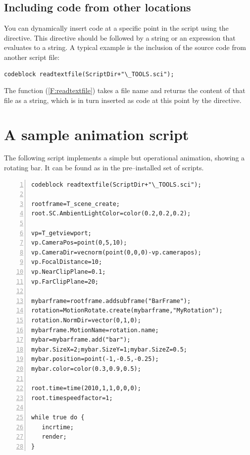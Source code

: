 \subsection{Including code from other locations}
You can dynamically insert code at a specific point in the script using the  directive. This directive should be followed by a string or an expression that evaluates to a string. A typical example is the inclusion of the source code from another script file:


\begin{lstlisting}
codeblock readtextfile(ScriptDir+"\_TOOLS.sci");
\end{lstlisting}

The function  (\ref{F:readtextfile}) takes a file name and returns the content of that file as a string, which is in turn inserted as code at this point by the  directive.

\section{A sample animation script}

The following \scriptlang script implements a simple but operational animation, showing a rotating bar. It can be found as  in the pre--installed set of scripts.

\begin{lstlisting}[numbers=left]
codeblock readtextfile(ScriptDir+"\_TOOLS.sci");

rootframe=T_scene_create;
root.SC.AmbientLightColor=color(0.2,0.2,0.2);

vp=T_getviewport;
vp.CameraPos=point(0,5,10);
vp.CameraDir=vecnorm(point(0,0,0)-vp.camerapos);
vp.FocalDistance=10;
vp.NearClipPlane=0.1;
vp.FarClipPlane=20;

mybarframe=rootframe.addsubframe("BarFrame");
rotation=MotionRotate.create(mybarframe,"MyRotation");
rotation.NormDir=vector(0,1,0);
mybarframe.MotionName=rotation.name;
mybar=mybarframe.add("bar");
mybar.SizeX=2;mybar.SizeY=1;mybar.SizeZ=0.5;
mybar.position=point(-1,-0.5,-0.25);
mybar.color=color(0.3,0.9,0.5);

root.time=time(2010,1,1,0,0,0);
root.timespeedfactor=1;

while true do {
   incrtime;
   render;
}
\end{lstlisting}

